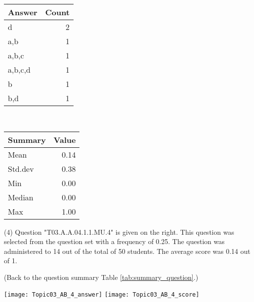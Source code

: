 \documentclass[12pt,english,nohyper]{tufte-handout}\usepackage[]{graphicx}\usepackage[]{color}
\begin{document}
\begin{center}%
\begin{tabular}{lr}
  \hline
Answer & Count \\ 
  \hline
d &   2 \\ 
  a,b &   1 \\ 
  a,b,c &   1 \\ 
  a,b,c,d &   1 \\ 
  b &   1 \\ 
  b,d &   1 \\ 
   \hline
\end{tabular}
~~~~~~~~%
\begin{tabular}{lr}
  \hline
Summary & Value \\ 
  \hline
Mean & 0.14 \\ 
  Std.dev & 0.38 \\ 
  Min & 0.00 \\ 
  Median & 0.00 \\ 
  Max & 1.00 \\ 
   \hline
\end{tabular}
\end{center}\newpage{} (4) Question "T03.A.A.04.1.1.MU.4" is given on the right. This question was selected from the question set with a frequency of 0.25. The question was administered to 14 out of the total of 50 students. The average score was 0.14 out of 1.

 (Back to the question summary Table \ref{tab:summary_question}.)

\begin{center} \texttt{[image: Topic03\_AB\_4\_answer]} \texttt{[image: Topic03\_AB\_4\_score]} \end{center} 
\end{document}
